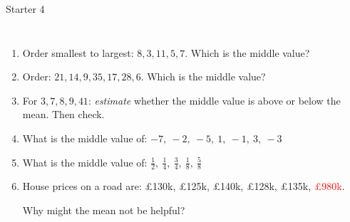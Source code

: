 \documentclass{beamer}
\newcommand{\ashow}[1]{\uncover<2->{\textcolor{red}{\small #1}}}
\begin{document}
\begin{frame}{Starter 4}
\begin{columns}[T]
\begin{enumerate}\itemsep1pt
\setcounter{enumi}{4}

  \item Order smallest to largest:
  $8,3,11,5,7$.
  Which is the middle value? \ashow{7}

  \item Order:
  $21,14,9,35,17,28,6$.
  Which is the middle value? \ashow{17}

  \item For $3,7,8,9,41$:
  \textit{estimate} whether the middle value is above or below the mean.
  Then check. \ashow{below: median $8$, mean $13.6$}

  \item What is the middle value of:
  $-7,\ -2,\ -5,\ 1,\ -1,\ 3,\ -3$ \ashow{$-2$}

  \item What is the middle value of:
  $\tfrac{1}{2},\ \tfrac{1}{4},\ \tfrac{3}{4},\ \tfrac{1}{8},\ \tfrac{5}{8}$ \ashow{$\frac{1}{2}$}

  \item House prices on a road are:
  \pounds130k,
  \pounds125k,
  \pounds140k,
  \pounds128k,
  \pounds135k,
  \textcolor{red}{\pounds980k}.

  Why might the mean not be helpful? \ashow{the \pounds980k outlier pulls the mean up}

\end{enumerate}

\end{columns}

\end{frame}
\end{document}
